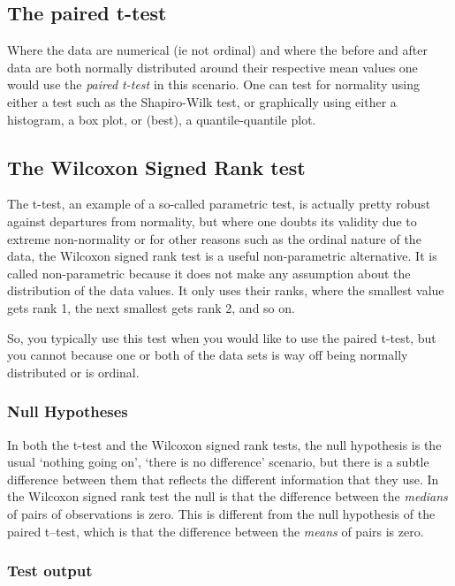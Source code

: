 \documentclass[
  letterpaper,
  DIV=11,
  numbers=noendperiod]{scrreprt}
\begin{document}
\subsection{The paired t-test}\label{the-paired-t-test}

Where the data are numerical (ie not ordinal) and where the before and
after data are both normally distributed around their respective mean
values one would use the \emph{paired t-test} in this scenario. One can
test for normality using either a test such as the Shapiro-Wilk test, or
graphically using either a histogram, a box plot, or (best), a
quantile-quantile plot.

\subsection{The Wilcoxon Signed Rank
test}\label{the-wilcoxon-signed-rank-test}

The t-test, an example of a so-called parametric test, is actually
pretty robust against departures from normality, but where one doubts
its validity due to extreme non-normality or for other reasons such as
the ordinal nature of the data, the Wilcoxon signed rank test is a
useful non-parametric alternative. It is called non-parametric because
it does not make any assumption about the distribution of the data
values. It only uses their ranks, where the smallest value gets rank 1,
the next smallest gets rank 2, and so on.

So, you typically use this test when you would like to use the paired
t-test, but you cannot because one or both of the data sets is way off
being normally distributed or is ordinal.

\subsubsection{Null Hypotheses}\label{null-hypotheses}

In both the t-test and the Wilcoxon signed rank tests, the null
hypothesis is the usual `nothing going on', `there is no difference'
scenario, but there is a subtle difference between them that reflects
the different information that they use. In the Wilcoxon signed rank
test the null is that the difference between the \emph{medians} of pairs
of observations is zero. This is different from the null hypothesis of
the paired t--test, which is that the difference between the
\emph{means} of pairs is zero.

\subsubsection{Test output}\label{test-output}
\end{document}
